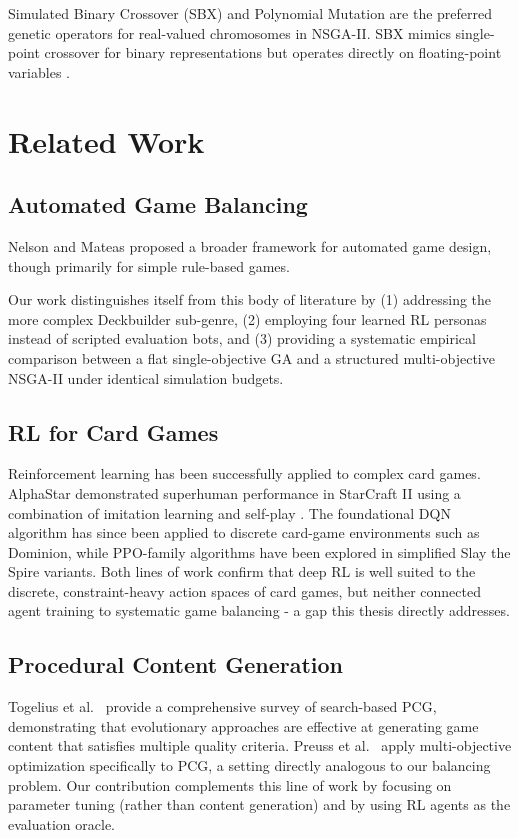 Simulated Binary Crossover (SBX) and Polynomial Mutation are the preferred genetic operators for real-valued chromosomes in NSGA-II. SBX mimics single-point crossover for binary representations but operates directly on floating-point variables \cite{deb2002fast}.

\section{Related Work}

\subsection{Automated Game Balancing}

Nelson and Mateas \cite{nelson2007towards} proposed a broader framework for automated game design, though primarily for simple rule-based games.

Our work distinguishes itself from this body of literature by (1) addressing the more complex Deckbuilder sub-genre, (2) employing four learned RL personas instead of scripted evaluation bots, and (3) providing a systematic empirical comparison between a flat single-objective GA and a structured multi-objective NSGA-II under identical simulation budgets.

\subsection{RL for Card Games}

Reinforcement learning has been successfully applied to complex card games. AlphaStar demonstrated superhuman performance in StarCraft II using a combination of imitation learning and self-play \cite{vinyals2019grandmaster}. The foundational DQN algorithm \cite{mnih2015human} has since been applied to discrete card-game environments such as Dominion, while PPO-family algorithms have been explored in simplified Slay the Spire variants. Both lines of work confirm that deep RL is well suited to the discrete, constraint-heavy action spaces of card games, but neither connected agent training to systematic game balancing - a gap this thesis directly addresses.

\subsection{Procedural Content Generation}

Togelius et al.\ \cite{togelius2011search} provide a comprehensive survey of search-based PCG, demonstrating that evolutionary approaches are effective at generating game content that satisfies multiple quality criteria. Preuss et al.\ \cite{preuss2012multiobjective} apply multi-objective optimization specifically to PCG, a setting directly analogous to our balancing problem. Our contribution complements this line of work by focusing on parameter tuning (rather than content generation) and by using RL agents as the evaluation oracle.
